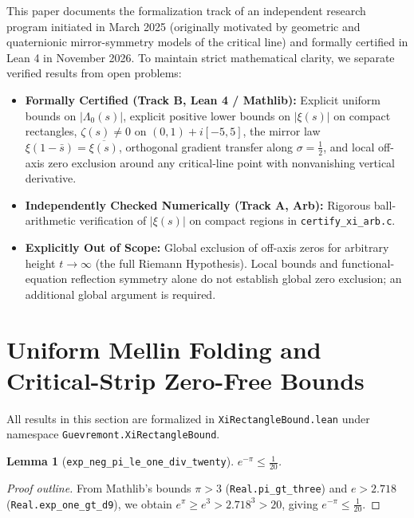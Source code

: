 \documentclass[11pt]{article}
\newtheorem{lemma}[theorem]{Lemma}
\theoremstyle{remark}
\begin{document}
This paper documents the formalization track of an independent research program initiated in March 2025 (originally motivated by geometric and quaternionic mirror-symmetry models of the critical line) and formally certified in Lean 4 in November 2026. To maintain strict mathematical clarity, we separate verified results from open problems:
\begin{itemize}
    \item \textbf{Formally Certified (Track B, Lean 4 / Mathlib):} Explicit uniform bounds on $|\Lambda_0(s)|$, explicit positive lower bounds on $|\xi(s)|$ on compact rectangles, $\zeta(s) \neq 0$ on $(0,1) + i[-5,5]$, the mirror law $\xi(1-\bar{s}) = \overline{\xi(s)}$, orthogonal gradient transfer along $\sigma = \frac{1}{2}$, and local off-axis zero exclusion around any critical-line point with nonvanishing vertical derivative.
    \item \textbf{Independently Checked Numerically (Track A, Arb):} Rigorous ball-arithmetic verification of $|\xi(s)|$ on compact regions in \texttt{certify\_\allowbreak xi\_\allowbreak arb.c}.
    \item \textbf{Explicitly Out of Scope:} Global exclusion of off-axis zeros for arbitrary height $t \to \infty$ (the full Riemann Hypothesis). Local bounds and functional-equation reflection symmetry alone do not establish global zero exclusion; an additional global argument is required.
\end{itemize}

\section{Uniform Mellin Folding and Critical-Strip Zero-Free Bounds}

All results in this section are formalized in \texttt{XiRectangleBound.lean} under namespace \texttt{Guevremont.\allowbreak XiRectangleBound}.

\begin{lemma}[\texttt{exp\_\allowbreak neg\_\allowbreak pi\_\allowbreak le\_\allowbreak one\_\allowbreak div\_\allowbreak twenty}]
$e^{-\pi} \le \frac{1}{20}$.
\end{lemma}
\begin{proof}[Proof outline]
From Mathlib's bounds $\pi > 3$ (\texttt{Real.pi\_\allowbreak gt\_\allowbreak three}) and $e > 2.718$ (\texttt{Real.exp\_\allowbreak one\_\allowbreak gt\_\allowbreak d9}), we obtain $e^{\pi} \ge e^3 > 2.718^3 > 20$, giving $e^{-\pi} \le \frac{1}{20}$.
\end{proof}
\end{document}
